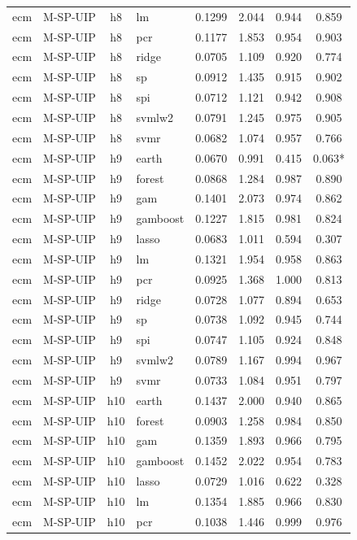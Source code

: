 \begin{ThreePartTable}
\begin{longtable}[t]{llclcccc}
ecm & M-SP-UIP & h8 & lm & 0.1299 & 2.044 & 0.944 & 0.859\\
ecm & M-SP-UIP & h8 & pcr & 0.1177 & 1.853 & 0.954 & 0.903\\
ecm & M-SP-UIP & h8 & ridge & 0.0705 & 1.109 & 0.920 & 0.774\\
ecm & M-SP-UIP & h8 & sp & 0.0912 & 1.435 & 0.915 & 0.902\\
ecm & M-SP-UIP & h8 & spi & 0.0712 & 1.121 & 0.942 & 0.908\\
ecm & M-SP-UIP & h8 & svmlw2 & 0.0791 & 1.245 & 0.975 & 0.905\\
ecm & M-SP-UIP & h8 & svmr & 0.0682 & 1.074 & 0.957 & 0.766\\
\addlinespace
ecm & M-SP-UIP & h9 & earth & 0.0670 & 0.991 & 0.415 & 0.063*\\
ecm & M-SP-UIP & h9 & forest & 0.0868 & 1.284 & 0.987 & 0.890\\
ecm & M-SP-UIP & h9 & gam & 0.1401 & 2.073 & 0.974 & 0.862\\
ecm & M-SP-UIP & h9 & gamboost & 0.1227 & 1.815 & 0.981 & 0.824\\
ecm & M-SP-UIP & h9 & lasso & 0.0683 & 1.011 & 0.594 & 0.307\\
ecm & M-SP-UIP & h9 & lm & 0.1321 & 1.954 & 0.958 & 0.863\\
ecm & M-SP-UIP & h9 & pcr & 0.0925 & 1.368 & 1.000 & 0.813\\
ecm & M-SP-UIP & h9 & ridge & 0.0728 & 1.077 & 0.894 & 0.653\\
ecm & M-SP-UIP & h9 & sp & 0.0738 & 1.092 & 0.945 & 0.744\\
ecm & M-SP-UIP & h9 & spi & 0.0747 & 1.105 & 0.924 & 0.848\\
ecm & M-SP-UIP & h9 & svmlw2 & 0.0789 & 1.167 & 0.994 & 0.967\\
ecm & M-SP-UIP & h9 & svmr & 0.0733 & 1.084 & 0.951 & 0.797\\
\addlinespace
ecm & M-SP-UIP & h10 & earth & 0.1437 & 2.000 & 0.940 & 0.865\\
ecm & M-SP-UIP & h10 & forest & 0.0903 & 1.258 & 0.984 & 0.850\\
ecm & M-SP-UIP & h10 & gam & 0.1359 & 1.893 & 0.966 & 0.795\\
ecm & M-SP-UIP & h10 & gamboost & 0.1452 & 2.022 & 0.954 & 0.783\\
ecm & M-SP-UIP & h10 & lasso & 0.0729 & 1.016 & 0.622 & 0.328\\
ecm & M-SP-UIP & h10 & lm & 0.1354 & 1.885 & 0.966 & 0.830\\
ecm & M-SP-UIP & h10 & pcr & 0.1038 & 1.446 & 0.999 & 0.976\\

\end{longtable}
\end{ThreePartTable}
